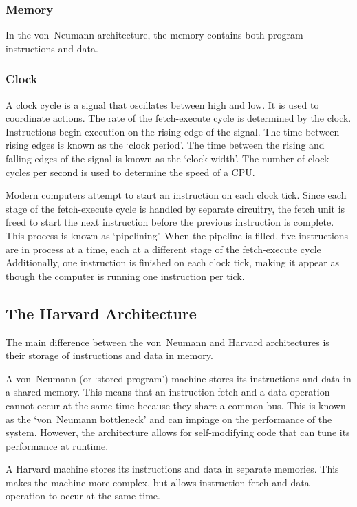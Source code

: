 \subsubsection{Memory}

In the von~Neumann architecture, the memory contains both program instructions and data.

\subsubsection{Clock}

A clock cycle is a signal that oscillates between high and low.
It is used to coordinate actions.
The rate of the fetch-execute cycle is determined by the clock.
Instructions begin execution on the rising edge of the signal.
The time between rising edges is known as the `clock period'.
The time between the rising and falling edges of the signal is known as the `clock width'.
The number of clock cycles per second is used to determine the speed of a CPU.

Modern computers attempt to start an instruction on each clock tick.
Since each stage of the fetch-execute cycle is handled by separate circuitry, the fetch unit is freed to start the next instruction before the previous instruction is complete.
This process is known as `pipelining'.
When the pipeline is filled, five instructions are in process at a time, each at a different stage of the fetch-execute cycle
Additionally, one instruction is finished on each clock tick, making it appear as though the computer is running one instruction per tick.

\subsection{The Harvard Architecture}

The main difference between the von~Neumann and Harvard architectures is their storage of instructions and data in memory.

A von~Neumann (or `stored-program') machine stores its instructions and data in a shared memory.
This means that an instruction fetch and a data operation cannot occur at the same time because they share a common bus.
This is known as the `von~Neumann bottleneck' and can impinge on the performance of the system.
However, the architecture allows for self-modifying code that can tune its performance at runtime.

A Harvard machine stores its instructions and data in separate memories.
This makes the machine more complex, but allows instruction fetch and data operation to occur at the same time.

